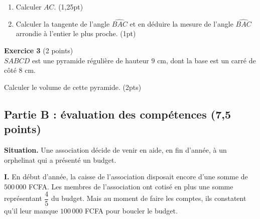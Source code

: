 \begin{enumerate}[label=\arabic*)]
\item Calculer $AC$. \hfill (1,25pt)
\item Calculer la tangente de l'angle $\widehat{BAC}$ et en déduire la mesure de l'angle
$\widehat{BAC}$ arrondie à l'entier le plus proche. \hfill (1pt)
\end{enumerate}

\textbf{Exercice 3} (2 points) \\
$SABCD$ est une pyramide régulière de hauteur $9$ cm, dont la base est un carré de côté
$8$ cm.

\begin{illus}
\end{illus}

\noindent Calculer le volume de cette pyramide. \hfill (2pts)

\subsection*{Partie B : évaluation des compétences (7,5 points)}

\textbf{Situation.} Une association décide de venir en aide, en fin d'année, à un
orphelinat qui a présenté un budget.

\textbf{I.} En début d'année, la caisse de l'association disposait encore d'une somme de
$500\,000$ FCFA. Les membres de l'association ont cotisé en plus une somme représentant
$\dfrac45$ du budget. Mais au moment de faire les comptes, ils constatent qu'il leur manque
$100\,000$ FCFA pour boucler le budget.

